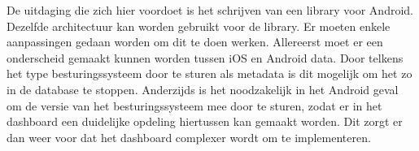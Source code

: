 De uitdaging die zich hier voordoet is het schrijven van een library voor Android. Dezelfde architectuur kan worden gebruikt voor de library. Er moeten enkele aanpassingen gedaan worden om dit te doen werken. Allereerst moet er een onderscheid gemaakt kunnen worden tussen iOS en Android data. Door telkens het type besturingssysteem door te sturen als metadata is dit mogelijk om het zo in de database te stoppen. Anderzijds is het noodzakelijk in het Android geval om de versie van het besturingssysteem mee door te sturen, zodat er in het dashboard een duidelijke opdeling hiertussen kan gemaakt worden. Dit zorgt er dan weer voor dat het dashboard complexer wordt om te implementeren.




